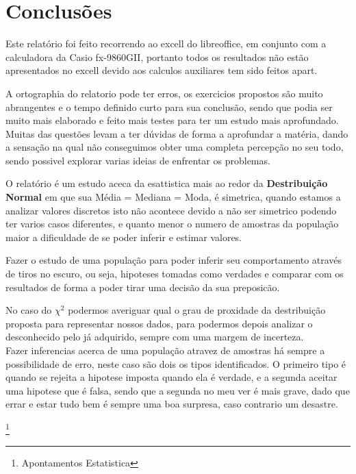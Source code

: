 \section{Conclusões}\label{Conclusão}
Este relatório foi feito recorrendo ao excell do libreoffice, em conjunto com a calculadora da Casio fx-9860GII, portanto todos os resultados não estão apresentados no excell devido aos calculos auxiliares tem sido feitos apart.

A ortographia do relatorio pode ter erros, os exercicios propostos são muito abrangentes e o tempo definido curto para sua conclusão, sendo que podia ser muito mais elaborado e feito mais testes para ter um estudo mais aprofundado.
Muitas das questões levam a ter dúvidas de forma a aprofundar a matéria, dando a sensação na qual não conseguimos obter uma completa percepção no seu todo, sendo possivel explorar varias ideias de enfrentar os problemas. 

O relatório é um estudo aceca da esattistica mais ao redor da \textbf{Destribuição Normal} em que sua Média = Mediana = Moda, é simetrica, quando estamos a analizar valores discretos isto não acontece devido a não ser simetrico podendo ter varios casos diferentes, e quanto menor o numero de amostras da população maior a dificuldade de se poder inferir e estimar valores.

Fazer o estudo de uma população para poder inferir seu comportamento através de tiros no escuro, ou seja, hipoteses tomadas como verdades e comparar com os resultados de forma a poder tirar uma decisão da sua preposicão.

No caso do $\chi^2$ podermos averiguar qual o grau de proxidade da destribuição proposta para representar nossos dados, para podermos depois analizar o desconhecido pelo já adquirido, sempre com uma margem de incerteza.
\\
Fazer inferencias acerca de uma população atravez de amostras há sempre a possibilidade de erro, neste caso são dois os tipos identificados. O primeiro tipo é quando se rejeita a hipotese imposta quando ela é verdade, e a segunda aceitar uma hipotese que é falsa, sendo que a segunda no meu ver é mais grave, dado que errar e estar tudo bem é sempre uma boa surpresa, caso contrario um desastre.





%
%
%
\listoffigures
\cite{*}

\footnote{Apontamentos Estatistica}


